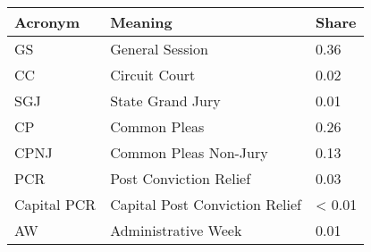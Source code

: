 \begin{tabular}{L{20mm}L{50mm}}
  \hline
  Acronym & Meaning & Share \\
  \hline
  GS & General Session & 0.36 \\
  CC & Circuit Court & 0.02\\
  SGJ & State Grand Jury & 0.01\\
  CP & Common Pleas & 0.26 \\
  CPNJ & Common Pleas Non-Jury & 0.13 \\
  PCR & Post Conviction Relief & 0.03  \\
  Capital PCR & Capital Post Conviction Relief & < 0.01 \\
  AW & Administrative Week & 0.01 \\
  \hline
\end{tabular}

